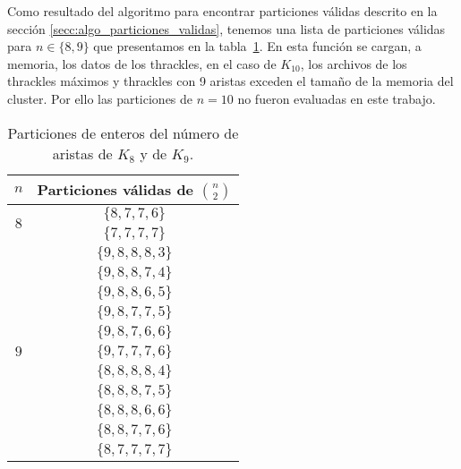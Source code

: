   Como resultado del algoritmo para encontrar particiones válidas descrito en la sección
  \ref{secc:algo_particiones_validas}, tenemos una lista de particiones válidas para
  $n\in\{8,9\}$ que presentamos en la tabla~\ref{tabla:particionesk8k9_2}. En esta función se
  cargan, a memoria, los datos de los thrackles, en el caso de $K_{10}$, los archivos de los
  thrackles máximos y thrackles con 9 aristas exceden el tamaño de la memoria del cluster. Por ello
  las particiones de $n=10$ no fueron evaluadas en este trabajo.
  \begin{table}[t]
    \centering
    \begin{tabular}{|c|c|}
      \hline
      $n$                       & Particiones válidas de $\displaystyle\binom{n}{2}$ \\ \hline\hline
      \multirow{2}{*}{$ 8 $}    & $\{8,7,7,6\}$ \\ \cline{2-2}
                                & $\{7,7,7,7\}$ \\ \hline
      \multirow{11}{*}{$ 9 $}   &$\{9,8,8,8,3\}$ \\ \cline{2-2}
                                &$\{9,8,8,7,4\}$ \\ \cline{2-2}
                                &$\{9,8,8,6,5\}$ \\ \cline{2-2}
                                &$\{9,8,7,7,5\}$ \\ \cline{2-2}
                                &$\{9,8,7,6,6\}$ \\ \cline{2-2}
                                &$\{9,7,7,7,6\}$ \\ \cline{2-2}
                                &$\{8,8,8,8,4\}$ \\ \cline{2-2}
                                &$\{8,8,8,7,5\}$ \\ \cline{2-2}
                                &$\{8,8,8,6,6\}$ \\ \cline{2-2}
                                &$\{8,8,7,7,6\}$ \\ \cline{2-2}
                                &$\{8,7,7,7,7\}$ \\ \hline
    \end{tabular}
    \caption{Particiones de enteros del número de aristas de $K_8$ y de $K_9$. }
    \label{tabla:particionesk8k9_2}
  \end{table}

